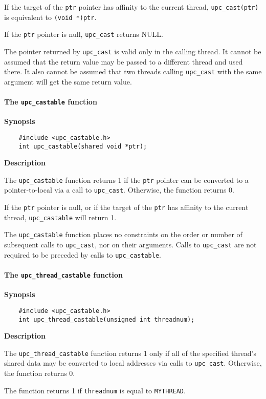 \np If the target of the {\tt ptr} pointer has affinity to the current
thread, {\tt upc\_cast(ptr)} is equivalent to {\tt (void *)ptr}.

\np If the {\tt ptr} pointer is null, {\tt upc\_cast} returns NULL.

\np The pointer returned by {\tt upc\_cast} is valid only in the calling
thread.  It cannot be assumed that the return value may be passed to
a different thread and used there.  It also cannot be assumed that two
threads calling {\tt upc\_cast} with the same argument will get the same
return value.

\paragraph{The {\tt upc\_castable} function}

{\bf Synopsis}

\npf\vspace{-2.5em}
\begin{verbatim}
    #include <upc_castable.h>
    int upc_castable(shared void *ptr);
\end{verbatim}

{\bf Description}

The {\tt upc\_castable} function returns 1 if the {\tt ptr} pointer
can be converted to a pointer-to-local via a call to {\tt upc\_cast}.
Otherwise, the function returns 0.

If the {\tt ptr} pointer is null, or if the target of the {\tt ptr} has
affinity to the current thread, {\tt upc\_castable} will return 1.

The {\tt upc\_castable} function places no constraints on the order or
number of subsequent calls to {\tt upc\_cast}, nor on their arguments.
Calls to {\tt upc\_cast} are not required to be preceded by calls to
{\tt upc\_castable}.

\paragraph{The {\tt upc\_thread\_castable} function}

{\bf Synopsis}

\npf\vspace{-2.5em}
\begin{verbatim}
    #include <upc_castable.h>
    int upc_thread_castable(unsigned int threadnum);
\end{verbatim}

{\bf Description}

The {\tt upc\_thread\_castable} function returns 1 only if all of the
specified thread's shared data may be converted to local addresses
via calls to {\tt upc\_cast}.  Otherwise, the function returns 0.

The function returns 1 if {\tt threadnum} is equal to {\tt MYTHREAD}.

\pagebreak
\appendix
